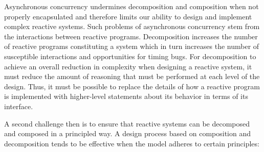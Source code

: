 Asynchronous concurrency undermines decomposition and composition when not properly encapsulated and therefore limits our ability to design and implement complex reactive systems.
Such problems of asynchronous concurrency stem from the interactions between reactive programs.
Decomposition increases the number of reactive programs constituting a system which in turn increases the number of susceptible interactions and opportunities for timing bugs.
For decomposition to achieve an overall reduction in complexity when designing a reactive system, it must reduce the amount of reasoning that must be performed at each level of the design.
Thus, it must be possible to replace the details of how a reactive program is implemented with higher-level statements about its behavior in terms of its interface.

A second challenge then is to ensure that reactive systems can be decomposed and composed in a principled way.
A design process based on composition and decomposition tends to be effective when the model adheres to certain principles:
